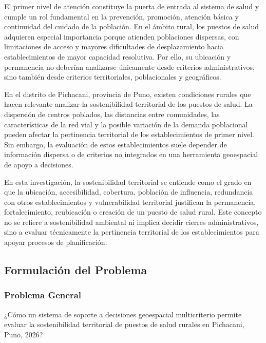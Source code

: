 \documentclass[12pt,a4paper,oneside]{article}
\begin{document}
El primer nivel de atención constituye la puerta de entrada al sistema de salud y cumple un rol fundamental en la prevención, promoción, atención básica y continuidad del cuidado de la población. En el ámbito rural, los puestos de salud adquieren especial importancia porque atienden poblaciones dispersas, con limitaciones de acceso y mayores dificultades de desplazamiento hacia establecimientos de mayor capacidad resolutiva. Por ello, su ubicación y permanencia no deberían analizarse únicamente desde criterios administrativos, sino también desde criterios territoriales, poblacionales y geográficos.

En el distrito de Pichacani, provincia de Puno, existen condiciones rurales que hacen relevante analizar la sostenibilidad territorial de los puestos de salud. La dispersión de centros poblados, las distancias entre comunidades, las características de la red vial y la posible variación de la demanda poblacional pueden afectar la pertinencia territorial de los establecimientos de primer nivel. Sin embargo, la evaluación de estos establecimientos suele depender de información dispersa o de criterios no integrados en una herramienta geoespacial de apoyo a decisiones.

En esta investigación, la sostenibilidad territorial se entiende como el grado en que la ubicación, accesibilidad, cobertura, población de influencia, redundancia con otros establecimientos y vulnerabilidad territorial justifican la permanencia, fortalecimiento, reubicación o creación de un puesto de salud rural. Este concepto no se refiere a sostenibilidad ambiental ni implica decidir cierres administrativos, sino a evaluar técnicamente la pertinencia territorial de los establecimientos para apoyar procesos de planificación.

\subsection{Formulación del Problema}
\subsubsection{Problema General}
¿Cómo un sistema de soporte a decisiones geoespacial multicriterio permite evaluar la sostenibilidad territorial de puestos de salud rurales en Pichacani, Puno, 2026?
\end{document}
